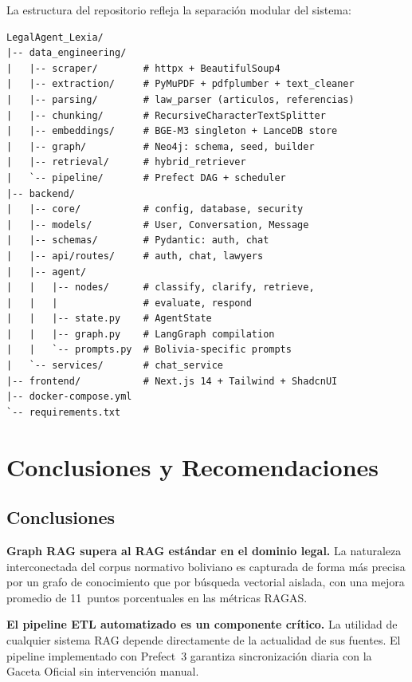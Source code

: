 \documentclass[12pt, letterpaper]{report}
\begin{document}
La estructura del repositorio refleja la separaci\'{o}n modular del sistema:

\begin{lstlisting}[caption={Estructura de directorios del proyecto LexIA}]
LegalAgent_Lexia/
|-- data_engineering/
|   |-- scraper/        # httpx + BeautifulSoup4
|   |-- extraction/     # PyMuPDF + pdfplumber + text_cleaner
|   |-- parsing/        # law_parser (articulos, referencias)
|   |-- chunking/       # RecursiveCharacterTextSplitter
|   |-- embeddings/     # BGE-M3 singleton + LanceDB store
|   |-- graph/          # Neo4j: schema, seed, builder
|   |-- retrieval/      # hybrid_retriever
|   `-- pipeline/       # Prefect DAG + scheduler
|-- backend/
|   |-- core/           # config, database, security
|   |-- models/         # User, Conversation, Message
|   |-- schemas/        # Pydantic: auth, chat
|   |-- api/routes/     # auth, chat, lawyers
|   |-- agent/
|   |   |-- nodes/      # classify, clarify, retrieve,
|   |   |               # evaluate, respond
|   |   |-- state.py    # AgentState
|   |   |-- graph.py    # LangGraph compilation
|   |   `-- prompts.py  # Bolivia-specific prompts
|   `-- services/       # chat_service
|-- frontend/           # Next.js 14 + Tailwind + ShadcnUI
|-- docker-compose.yml
`-- requirements.txt
\end{lstlisting}


\chapter{Conclusiones y Recomendaciones}

\section{Conclusiones}

\textbf{Graph RAG supera al RAG est\'{a}ndar en el dominio legal.} La naturaleza interconectada del corpus normativo boliviano es capturada de forma m\'{a}s precisa por un grafo de conocimiento que por b\'{u}squeda vectorial aislada, con una mejora promedio de 11~puntos porcentuales en las m\'{e}tricas RAGAS.

\textbf{El pipeline ETL automatizado es un componente cr\'{i}tico.} La utilidad de cualquier sistema RAG depende directamente de la actualidad de sus fuentes. El pipeline implementado con Prefect~3 garantiza sincronizaci\'{o}n diaria con la Gaceta Oficial sin intervenci\'{o}n manual.
\end{document}
